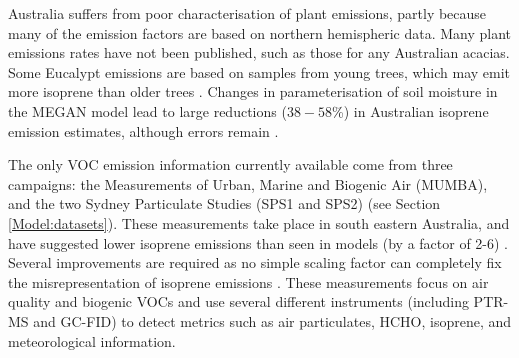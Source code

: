     
    Australia suffers from poor characterisation of plant emissions, partly because many of the emission factors are based on northern hemispheric data.
    Many plant emissions rates have not been published, such as those for any Australian acacias.
    Some Eucalypt emissions are based on samples from young trees, which may emit more isoprene than older trees \parencite{Emmerson2016}.
    Changes in parameterisation of soil moisture in the MEGAN model lead to large reductions ($38-58$\%) in Australian isoprene emission estimates, although errors remain \parencite{Sindelarova2014, Emmerson2019}.
    
    
    The only VOC emission information currently available come from three campaigns: the Measurements of Urban, Marine and Biogenic Air (MUMBA), and the two Sydney Particulate Studies (SPS1 and SPS2) (see Section \ref{Model:datasets}).
    These measurements take place in south eastern Australia, and have suggested lower isoprene emissions than seen in models (by a factor of 2-6) \parencite{Emmerson2016}.
    Several improvements are required as no simple scaling factor can completely fix the misrepresentation of isoprene emissions \parencite{Emmerson2016}.
    These measurements focus on air quality and biogenic VOCs and use several different instruments (including PTR-MS and GC-FID) to detect metrics such as air particulates, HCHO, isoprene, and meteorological information.
